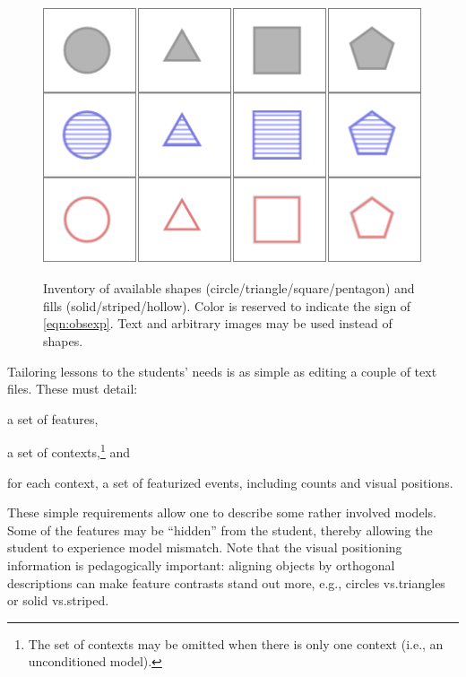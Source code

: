 \documentclass[11pt,letterpaper]{article}
\newcommand{\Note}[1]{}
\renewcommand{\Note}[1]{\hl{[#1]}}  %
\newcommand{\NoteSigned}[3]{{\sethlcolor{#2}\Note{#1: #3}}}
\newcommand{\NoteFF}[1]{\NoteSigned{FF}{LightBlue}{#1}}
\newcommand{\NoteJE}[1]{\NoteSigned{JE}{LightGreen}{#1}}
\begin{document}
\begin{figure}[t]
\begin{center}
\centering
\includegraphics[scale=.5]{images/different_shapes_fills3x4.PNG}
\caption{Inventory of available shapes
  (circle/triangle/square/pentagon) and fills (solid/striped/hollow).
  Color is reserved to indicate the sign of \eqref{eqn:obsexp}.  Text
  and arbitrary images may be used instead of shapes.}
\label{fig:shape_inventory}
\label{fig:inventory}
\end{center}
\end{figure}

Tailoring lessons to the students' needs is as simple as editing a
couple of text files. These must detail:
\begin{inparaenum}[(1)]
\item a set of features, 
\item a set of contexts,\footnote{The set of contexts may be omitted
    when there is only one context (i.e., an unconditioned model).}
  and
\item for each context, a set of 
featurized events, including counts and visual positions.
\end{inparaenum}
These simple requirements allow one to describe some rather involved
models.  Some of the features may be ``hidden'' from the student, thereby allowing the student to experience 
model mismatch.  Note that the visual positioning information is pedagogically 
important: aligning objects by orthogonal descriptions can make feature contrasts stand out more, 
e.g., circles vs.\@ triangles or solid vs.\@ striped.
\end{document}
